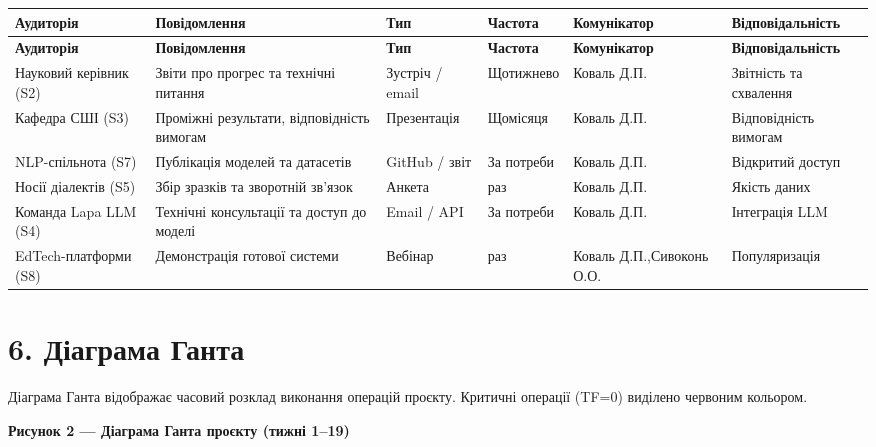 \documentclass[14pt]{extarticle}
\begin{document}
\begin{longtable}{|>{\raggedright\arraybackslash}p{}|>{\raggedright\arraybackslash}p{}|>{\raggedright\arraybackslash}p{}|>{\raggedright\arraybackslash}p{}|>{\raggedright\arraybackslash}p{}|>{\raggedright\arraybackslash}p{}|}
\hline
\textbf{Аудиторія} & \textbf{По\-ві\-дом\-лення} & \textbf{Тип} & \textbf{Частота} & \textbf{Кому\-нікатор} & \textbf{Від\-по\-ві\-даль\-ність} \\
\hline
\endfirsthead
\hline
\textbf{Аудиторія} & \textbf{По\-ві\-дом\-лення} & \textbf{Тип} & \textbf{Частота} & \textbf{Кому\-нікатор} & \textbf{Від\-по\-ві\-даль\-ність} \\
\hline
\endhead
Науковий керівник (S2) & Звіти про прогрес та технічні питання & Зустріч / email & Що\-тижнево & Коваль Д.П. & Звітність та схвалення \\
\hline
Кафедра СШІ (S3) & Проміжні результати, відповідність вимогам & Пре\-зен\-тація & Що\-місяця & Коваль Д.П. & Від\-по\-від\-ність вимогам \\
\hline
NLP-спільнота (S7) & Публікація моделей та датасетів & GitHub / звіт & За потреби & Коваль Д.П. & Від\-критий доступ \\
\hline
Носії діалектів (S5) & Збір зразків та зворотній зв'язок & Анкета & 1 раз & Коваль Д.П. & Якість даних \\
\hline
Команда Lapa LLM (S4) & Технічні консультації та доступ до моделі & Email / API & За потреби & Коваль Д.П. & Інтеграція LLM \\
\hline
EdTech-платформи (S8) & Демонстрація готової системи & Вебінар & 1 раз & Коваль Д.П.,\newline Сивоконь О.О. & Попу\-ляри\-зація \\
\hline
\end{longtable}

\section*{6. Діаграма Ганта}

Діаграма Ганта відображає часовий розклад виконання операцій проєкту. Критичні операції (TF=0) виділено червоним кольором.

\vspace{8pt}
\noindent\textbf{Рисунок 2 --- Діаграма Ганта проєкту (тижні 1--19)}
\end{document}
